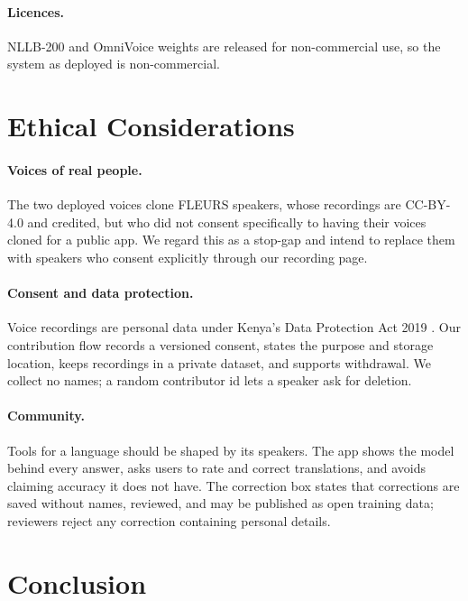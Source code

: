 \documentclass[11pt]{article}
\begin{document}
\paragraph{Licences.} NLLB-200 and OmniVoice weights are released for non-commercial use, so the system as deployed is non-commercial.

\section{Ethical Considerations}

\paragraph{Voices of real people.} The two deployed voices clone FLEURS speakers, whose recordings are CC-BY-4.0 and credited, but who did not consent specifically to having their voices cloned for a public app. We regard this as a stop-gap and intend to replace them with speakers who consent explicitly through our recording page.

\paragraph{Consent and data protection.} Voice recordings are personal data under Kenya's Data Protection Act 2019 \citep{kenyadpa2019}. Our contribution flow records a versioned consent, states the purpose and storage location, keeps recordings in a private dataset, and supports withdrawal. We collect no names; a random contributor id lets a speaker ask for deletion.

\paragraph{Community.} Tools for a language should be shaped by its speakers. The app shows the model behind every answer, asks users to rate and correct translations, and avoids claiming accuracy it does not have. The correction box states that corrections are saved without names, reviewed, and may be published as open training data; reviewers reject any correction containing personal details.

\section{Conclusion}
\end{document}
